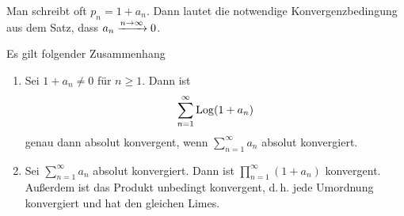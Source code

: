 \begin{nota}
Man schreibt oft $p_n = 1 + a_n$. Dann lautet die notwendige Konvergenzbedingung aus dem Satz, dass $a_n \xrightarrow{n\to\infty} 0$.
\end{nota}





\begin{satz}\label{satz:zusammenhang-konvergenz-log-reihe}
Es gilt folgender Zusammenhang
\begin{enumerate}
\item Sei $1+a_n \not= 0$ für $n \geq 1$. Dann ist
\[
	\sum _{n=1}^\infty \operatorname{Log} (1+a_n)
\]
genau dann absolut konvergent, wenn $\sum_{n=1}^\infty a_n$ absolut konvergiert.

\item Sei $\sum_{n=1}^\infty a_n$ absolut konvergiert. Dann ist $\prod _{n=1}^\infty (1+a_n)$ konvergent.
Außerdem ist das Produkt unbedingt konvergent, d.\,h. jede Umordnung konvergiert und hat den gleichen Limes.
\end{enumerate}
\end{satz}

